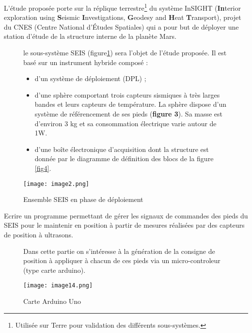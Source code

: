 

L'étude proposée porte sur la réplique terrestre\footnote{Utilisée sur Terre pour validation des différents sous-systèmes.} du
système InSIGHT (\textbf{In}terior exploration using \textbf{S}eismic
\textbf{I}nvestigations, \textbf{G}eodesy and \textbf{H}eat
\textbf{T}ransport), projet du CNES (Centre National d'Études Spatiales)
qui a pour but de déployer une station d'étude de la structure interne
de la planète Mars.





\begin{figure}[!htb]
\begin{center}
\begin{minipage}{0.55\textwidth}
le sous-système SEIS (figure\ref{fig2}) sera l'objet de l'étude proposée. Il est
basé sur un instrument hybride composé :

\begin{itemize}
\item
  d'un système de déploiement (DPL) ;
\item
  d'une sphère comportant trois capteurs sismiques à très larges bandes
  et leurs capteurs de température. La sphère dispose d'un système de
  référencement de ses pieds (\textbf{figure 3}). Sa masse est d'environ
  3 kg et sa consommation électrique varie autour de 1W.
\item
  d'une boîte électronique d'acquisition dont la structure est donnée
  par le diagramme de définition des blocs de la figure \ref{fig4}.
\end{itemize}
\end{minipage}
\begin{minipage}{0.45\textwidth}
\texttt{[image: image2.png]}
\caption{Ensemble SEIS en phase de déploiement \label{fig2}}
\end{minipage}
\end{center}
\end{figure}

\begin{obj}
Ecrire un programme permettant de gérer les
signaux de commandes des pieds du SEIS pour le maintenir en position à
partir de mesures réalisées par des capteurs de position à ultrasons.
\end{obj}

\begin{figure}[!htb]
\begin{center}
\begin{minipage}{0.55\textwidth}
Dans cette partie on s'intéresse à la génération de la consigne de position à appliquer à chacun de ces pieds via un micro-controleur (type carte arduino).
\end{minipage}
\begin{minipage}{0.45\textwidth}
\texttt{[image: image14.png]}
\caption{Carte Arduino Uno \label{fig3}}
\end{minipage}
\end{center}
\end{figure}


